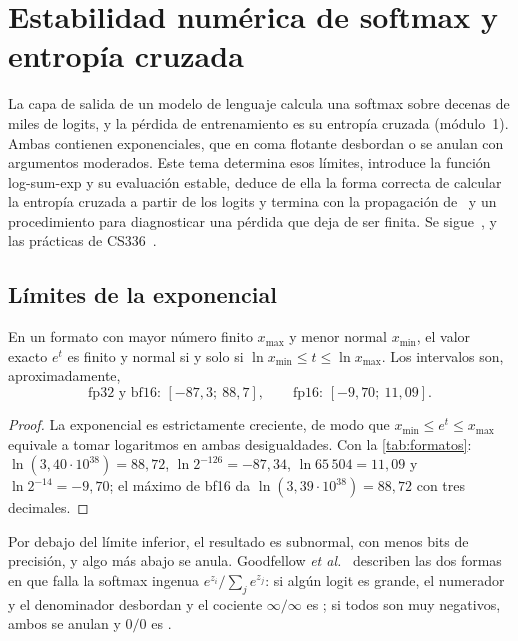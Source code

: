 \chapter{Estabilidad numérica de softmax y entropía cruzada}
\label{tema:6}

La capa de salida de un modelo de lenguaje calcula una softmax sobre decenas de miles de logits, y la pérdida de entrenamiento es su entropía cruzada (módulo~1). Ambas contienen exponenciales, que en coma flotante desbordan o se anulan con argumentos moderados. Este tema determina esos límites, introduce la función log-sum-exp y su evaluación estable, deduce de ella la forma correcta de calcular la entropía cruzada a partir de los logits y termina con la propagación de \NaN\ y un procedimiento para diagnosticar una pérdida que deja de ser finita. Se sigue~\cite[§4.1]{gbc}, \cite[§4.5.2]{d2l} y las prácticas de CS336~\cite{cs336}.

\section{Límites de la exponencial}

\begin{proposicion}\label{prop:exp-rango}
En un formato con mayor número finito $x_{\max}$ y menor normal $x_{\min}$, el valor exacto $e^{t}$ es finito y normal si y solo si $\ln x_{\min}\le t\le\ln x_{\max}$. Los intervalos son, aproximadamente,
\[
\text{fp32 y bf16: }[-87{,}3;\ 88{,}7],\qquad \text{fp16: }[-9{,}70;\ 11{,}09].
\]
\end{proposicion}

\begin{proof}
La exponencial es estrictamente creciente, de modo que $x_{\min}\le e^{t}\le x_{\max}$ equivale a tomar logaritmos en ambas desigualdades. Con la \cref{tab:formatos}: $\ln(3{,}40\cdot 10^{38})=88{,}72$, $\ln 2^{-126}=-87{,}34$, $\ln 65\,504=11{,}09$ y $\ln 2^{-14}=-9{,}70$; el máximo de bf16 da $\ln(3{,}39\cdot 10^{38})=88{,}72$ con tres decimales.
\end{proof}

Por debajo del límite inferior, el resultado es subnormal, con menos bits de precisión, y algo más abajo se anula. Goodfellow \emph{et al.}~\cite[§4.1]{gbc} describen las dos formas en que falla la softmax ingenua $e^{z_i}/\sum_je^{z_j}$: si algún logit es grande, el numerador y el denominador desbordan y el cociente $\infty/\infty$ es \NaN; si todos son muy negativos, ambos se anulan y $0/0$ es \NaN.

